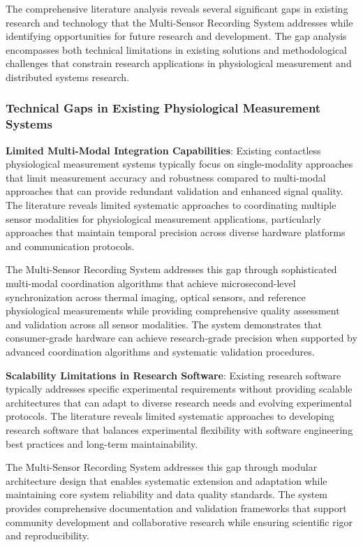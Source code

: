 \documentclass[12pt,a4paper]{article}
\begin{document}
The comprehensive literature analysis reveals several significant gaps in existing research and technology that the
Multi-Sensor Recording System addresses while identifying opportunities for future research and development. The gap
analysis encompasses both technical limitations in existing solutions and methodological challenges that constrain
research applications in physiological measurement and distributed systems research.

\subsubsection{Technical Gaps in Existing Physiological Measurement Systems}

\textbf{Limited Multi-Modal Integration Capabilities}: Existing contactless physiological measurement systems typically focus
on single-modality approaches that limit measurement accuracy and robustness compared to multi-modal approaches that can
provide redundant validation and enhanced signal quality. The literature reveals limited systematic approaches to
coordinating multiple sensor modalities for physiological measurement applications, particularly approaches that
maintain temporal precision across diverse hardware platforms and communication protocols.

The Multi-Sensor Recording System addresses this gap through sophisticated multi-modal coordination algorithms that
achieve microsecond-level synchronization across thermal imaging, optical sensors, and reference physiological
measurements while providing comprehensive quality assessment and validation across all sensor modalities. The system
demonstrates that consumer-grade hardware can achieve research-grade precision when supported by advanced coordination
algorithms and systematic validation procedures.

\textbf{Scalability Limitations in Research Software}: Existing research software typically addresses specific experimental
requirements without providing scalable architectures that can adapt to diverse research needs and evolving experimental
protocols. The literature reveals limited systematic approaches to developing research software that balances
experimental flexibility with software engineering best practices and long-term maintainability.

The Multi-Sensor Recording System addresses this gap through modular architecture design that enables systematic
extension and adaptation while maintaining core system reliability and data quality standards. The system provides
comprehensive documentation and validation frameworks that support community development and collaborative research
while ensuring scientific rigor and reproducibility.
\end{document}
